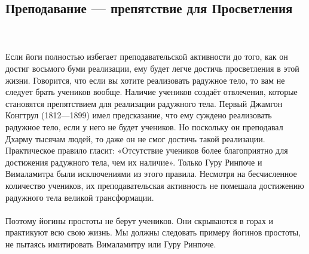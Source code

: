 \subsection{Преподавание — препятствие для Просветления}
\\ \\ Если йоги полностью избегает преподавательской активности до того, как он достиг восьмого буми реализации, ему будет легче достичь просветления в этой жизни. Говорится, что если вы хотите реализовать радужное тело, то вам не следует брать учеников вообще. Наличие учеников создаёт отвлечения, которые становятся препятствием для реализации радужного тела. Первый Джамгон Конгтрул (1812—1899) имел предсказание, что ему суждено реализовать радужное тело, если у него не будет учеников. Но поскольку он преподавал Дхарму тысячам людей, то даже он не смог достичь такой реализации. Практическое правило гласит: «Отсутствие учеников более благоприятно для достижения радужного тела, чем их наличие». Только Гуру Ринпоче и Вималамитра были исключениями из этого правила. Несмотря на бесчисленное количество учеников, их преподавательская активность не помешала достижению радужного тела великой трансформации.
\\ \\ Поэтому йогины простоты не берут учеников. Они скрываются в горах и практикуют всю свою жизнь. Мы должны следовать примеру йогинов простоты, не пытаясь имитировать Вималамитру или Гуру Ринпоче.
